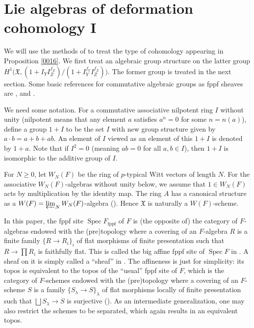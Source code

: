 \documentclass{amsart}
\theoremstyle{remark}
\numberwithin{equation}{section}
\newcommand{\fppf}{\mathrm{fppf}}
\newcommand{\invlim}{\varprojlim}
\DeclareMathOperator{\Spec}{Spec}
\begin{document}

\section{Lie algebras of deformation cohomology I}
\label{0010}

We will use the methods of \cite{Lip76}
to treat the type of cohomology appearing in Proposition \ref{0016}.
We first treat an algebraic group structure on the latter group
$H^{1} \bigl( \mathfrak{X}, (1 + I_{Y} I_{Z}^{f_{Z}}) / (1 + I_{Y}^{f_{Y}} I_{Z}^{f_{Z}}) \bigr)$.
The former group is treated in the next section.
Some basic references for commutative algebraic groups as fppf sheaves
are \cite{DG70DemaGab}, \cite{DG70SGA} and \cite{Oor66}.

We need some notation.
For a commutative associative nilpotent ring $I$ without unity
(nilpotent means that any element $a$ satisfies $a^{n} = 0$ for some $n = n(a)$),
define a group $1 + I$ to be the set $I$ with new group structure given by
$a \cdot b = a + b + a b$.
An element of $I$ viewed as an element of this $1 + I$ is denoted by $1 + a$.
Note that if $I^{2} = 0$ (meaning $a b = 0$ for all $a, b \in I$),
then $1 + I$ is isomorphic to the additive group of $I$.

For $N \ge 0$, let $W_{N}(F)$ be the ring of $p$-typical Witt vectors of length $N$.
For the associative $W_{N}(F)$-algebras without unity below,
we assume that $1 \in W_{N}(F)$ acts by multiplication by the identity map.
The ring $A$ has a canonical structure as a $W(F) = \invlim_{N} W_{N}(F)$-algebra
(\cite[Chapter V, Section 4, Theorem 2.1]{DG70DemaGab}).
Hence $\mathfrak{X}$ is naturally a $W(F)$-scheme.

In this paper, the fppf site $\Spec F_{\fppf}$ of $F$ is
(the opposite of) the category of $F$-algebras
endowed with the (pre)topology where a covering of an $F$-algebra $R$ is
a finite family $\{R \to R_{i}\}_{i}$ of flat morphisms of finite presentation
such that $R \to \prod R_{i}$ is faithfully flat.
This is called the big affine fppf site of $\Spec F$ in \cite[Tag 021S]{Sta22}.
A sheaf on it is simply called a ``sheaf''
in \cite[Chapter III, Section 1, No.\ 1.2]{DG70DemaGab}.
The affineness is just for simplicity:
its topos is equivalent to the topos of the ``usual'' fppf site of $F$,
which is the category of $F$-schemes
endowed with the (pre)topology where a covering of an $F$-scheme $S$ is
a family $\{S_{\lambda} \to S\}_{\lambda}$ of flat morphisms locally of finite presentation
such that $\bigsqcup S_{\lambda} \to S$ is surjective (\cite[Tag 021V]{Sta22}).
As an intermediate generalization,
one may also restrict the schemes to be separated,
which again results in an equivalent topos.
\end{document}
